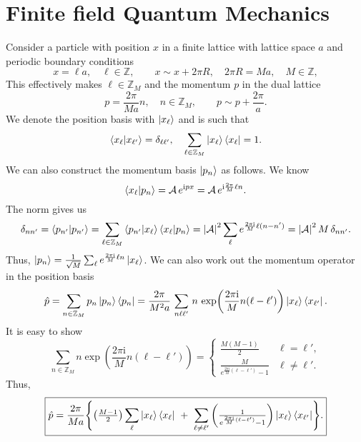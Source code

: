 \documentclass[10pt, a4paper]{article}
\newcommand{\ii}{\mathrm{i}}
\numberwithin{equation}{section}
\begin{document}
\section{Finite field Quantum Mechanics}
Consider a particle with position $x$ in a finite lattice with lattice space $a$ and periodic boundary conditions
\begin{equation}
  x = \ell a, \quad \ell \in \mathbb{Z}, \qquad x \sim x + 2 \pi R, \quad 2\pi R = M a, \quad M \in \mathbb{Z},
\end{equation}
This effectively makes $\ell \in \mathbb{Z}_M$ and the momentum $p$ in the dual lattice
\begin{equation}
  p = \frac{2 \pi}{M a} n, \quad n \in \mathbb{Z}_M, \qquad p \sim p + \frac{2 \pi}{a}.
\end{equation}
We denote the position basis with $\ket{x_\ell}$ and is such that
\begin{equation}
  \bra{x_\ell}\ket{x_{\ell'}} = \delta_{\ell \ell'}, \quad \sum_{\ell \in \mathbb{Z}_M} \ket{x_\ell}\bra{x_\ell} = 1.
\end{equation}
We can also construct the momentum basis $\ket{p_n}$ as follows. We know
\begin{equation}
  \bra{x_\ell}\ket{p_n} = \mathcal{A} \, e^{\ii p x} = \mathcal{A} \, e^{\ii \frac{2 \pi}{M} \ell n}.
\end{equation}
The norm gives us
\begin{equation}
  \delta_{n n'} = \bra{p_{n'}} \ket{p_{n'}} = \sum_{\ell \in \mathbb{Z}_M} \bra{p_{n'}}\ket{x_\ell} \bra{x_\ell}\ket{p_n} = \abs{\mathcal{A}}^2 \sum_{\ell} e^{\frac{2\pi \ii}{M} \ell (n - n')} = \abs{\mathcal{A}}^2 \, M \, \delta_{n n'}.
\end{equation}
Thus, $\ket{p_n} = \frac{1}{\sqrt{M}} \sum_{\ell} e^{\frac{2\pi\ii}{M} \ell n} \ket{x_\ell}$. We can also work out the momentum operator in the position basis
\begin{equation}
  \hat{p} = \sum_{n \in \mathbb{Z}_M} p_n \ket{p_n} \bra{p_n} = \frac{2 \pi}{M^2 a} \, \sum_{n \ell \ell'} \, n  \, \exp(\frac{2 \pi \ii}{M} n (\ell - \ell')) \ket{x_\ell} \bra{x_{\ell'}}.
\end{equation}
It is easy to show
\begin{equation}
  \sum_{n \in \mathbb{Z}_M} n \exp(\frac{2 \pi \ii}{M} n (\ell - \ell')) = \begin{cases}
    \frac{M (M-1)}{2} & \ell = \ell', \\
    \frac{M}{e^{\frac{2\pi\ii}{M} (\ell - \ell')} - 1} & \ell \neq \ell'.
  \end{cases}
\end{equation}
Thus,
\begin{equation}
  \boxed{
  \hat{p} = \frac{2 \pi}{M a} \Biggl\{ \qty(\tfrac{M-1}{2}) \sum_{\ell} \ket{x_\ell} \bra{x_\ell} \ + \ \sum_{\ell \neq \ell'} \qty(\tfrac{1}{e^{\frac{2\pi\ii}{M} (\ell - \ell')} - 1}) \ket{x_\ell} \bra{x_{\ell'}} \Biggr\}.
  }
\end{equation}
\end{document}
